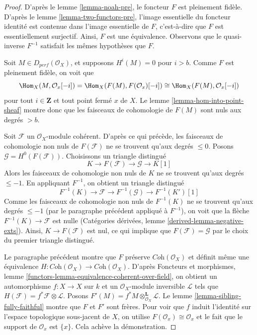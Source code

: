 \begin{proof}
D'après le lemme \ref{lemma-noah-pre}, le foncteur $F$ est pleinement fidèle.
D'après le lemme \ref{lemma-two-functors-pre}, l'image essentielle du
foncteur identité est contenue dans l'image essentielle de $F$, c'est-à-dire
que $F$ est essentiellement surjectif. Ainsi, $F$ est une équivalence.
Observons que le quasi-inverse $F^{-1}$ satisfait les mêmes hypothèses
que $F$.

\medskip\noindent
Soit $M \in D_{perf}(\mathcal{O}_X)$, et supposons $H^i(M) = 0$ pour $i > b$.
Comme $F$ est pleinement fidèle, on voit que
$$
\Hom_X(M, \mathcal{O}_x[-i]) =
\Hom_X(F(M), F(\mathcal{O}_x)[-i]) \cong
\Hom_X(F(M), \mathcal{O}_x[-i])
$$
pour tout $i \in \mathbf{Z}$ et tout point fermé $x$ de $X$.
Le lemme \ref{lemma-hom-into-point-sheaf} montre donc que les faisceaux de cohomologie de $F(M)$
sont nuls aux degrés $> b$.

\medskip\noindent
Soit $\mathcal{F}$ un $\mathcal{O}_X$-module cohérent. D'après
ce qui précède, les faisceaux de cohomologie non nuls de $F(\mathcal{F})$
ne se trouvent qu'aux degrés $\leq 0$.
Posons $\mathcal{G} = H^0(F(\mathcal{F}))$. Choisissons un triangle
distingué
$$
K \to F(\mathcal{F}) \to \mathcal{G} \to K[1]
$$
Alors les faisceaux de cohomologie non nuls de $K$ ne se trouvent qu'aux
degrés $\leq -1$.
En appliquant $F^{-1}$, on obtient un triangle distingué
$$
F^{-1}(K) \to \mathcal{F} \to F^{-1}(\mathcal{G}) \to F^{-1}(K')[1]
$$
Comme les faisceaux de cohomologie non nuls de $F^{-1}(K)$ ne se trouvent qu'aux
degrés $\leq -1$ (par le paragraphe précédent appliqué à $F^{-1}$),
on voit que la flèche $F^{-1}(K) \to \mathcal{F}$ est nulle
(Catégories dérivées, lemme \ref{derived-lemma-negative-exts}).
Ainsi, $K \to F(\mathcal{F})$ est nul, ce qui implique
que $F(\mathcal{F}) = \mathcal{G}$ par le choix du
premier triangle distingué.

\medskip\noindent
Le paragraphe précédent montre que $F$ préserve
$\textit{Coh}(\mathcal{O}_X)$ et définit même une équivalence
$H : \textit{Coh}(\mathcal{O}_X) \to \textit{Coh}(\mathcal{O}_X)$.
D'après Foncteurs et morphismes, lemme
\ref{functors-lemma-equivalence-coherent-over-field},
on obtient un automorphisme $f : X \to X$ sur $k$
et un $\mathcal{O}_X$-module inversible $\mathcal{L}$
tels que $H(\mathcal{F}) = f^*\mathcal{F} \otimes \mathcal{L}$.
Posons $F'(M) = f^*M \otimes_{\mathcal{O}_X}^\mathbf{L} \mathcal{L}$.
Le lemme \ref{lemma-sibling-fully-faithful}
montre que $F$ et $F'$ sont frères.
Pour voir que $f$ induit l'identité sur l'espace topologique
sous-jacent de $X$, on utilise $F(\mathcal{O}_x) \cong \mathcal{O}_x$
et le fait que le support de $\mathcal{O}_x$ est $\{x\}$.
Cela achève la démonstration.
\end{proof}

